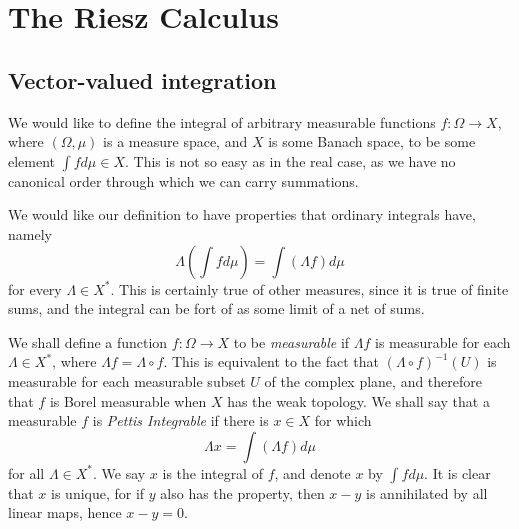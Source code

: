 \section{The Riesz Calculus}

\subsection{Vector-valued integration}

We would like to define the integral of arbitrary measurable functions $f: \Omega \to X$, where $(\Omega, \mu)$ is a measure space, and $X$ is some Banach space, to be some element $\int f d\mu \in X$. This is not so easy as in the real case, as we have no canonical order through which we can carry summations.

We would like our definition to have properties that ordinary integrals have, namely
%
\[ \Lambda \left( \int f d\mu \right) = \int (\Lambda f) d\mu \]
%
for every $\Lambda \in X^*$. This is certainly true of other measures, since it is true of finite sums, and the integral can be fort of as some limit of a net of sums.

We shall define a function $f: \Omega \to X$ to be \emph{measurable} if $\Lambda f$ is measurable for each $\Lambda \in X^*$, where $\Lambda f = \Lambda \circ f$. This is equivalent to the fact that $(\Lambda \circ f)^{-1}(U)$ is measurable for each measurable subset $U$ of the complex plane, and therefore that $f$ is Borel measurable when $X$ has the weak topology. We shall say that a measurable $f$ is \emph{Pettis Integrable} if there is $x \in X$ for which
%
\[ \Lambda x = \int (\Lambda f) d\mu \]
%
for all $\Lambda \in X^*$. We say $x$ is the integral of $f$, and denote $x$ by $\int f d\mu$. It is clear that $x$ is unique, for if $y$ also has the property, then $x - y$ is annihilated by all linear maps, hence $x - y = 0$.

